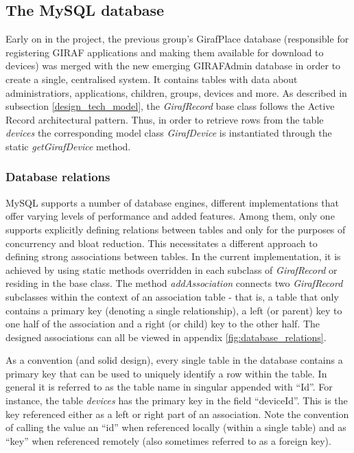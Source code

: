 \subsection{The MySQL database}
Early on in the project, the previous group's GirafPlace database (responsible for registering GIRAF applications and making them available for download to devices) was merged with the new emerging GIRAFAdmin database in order to create a single, centralised system. It contains tables with data about administratiors, applications, children, groups, devices and more.
As described in subsection \vref{design_tech_model}, the \emph{GirafRecord} base class follows the Active Record architectural pattern. Thus, in order to retrieve rows from the table \emph{devices} the corresponding model class \emph{GirafDevice} is instantiated through the static \emph{getGirafDevice} method.

\subsubsection*{Database relations}
MySQL supports a number of database engines, different implementations that offer varying levels of performance and added features. Among them, only one supports explicitly defining relations between tables and only for the purposes of concurrency and bloat reduction. This necessitates a different approach to defining strong associations between tables. In the current implementation, it is achieved by using static methods overridden in each subclass of \emph{GirafRecord} or residing in the base class.
The method \emph{addAssociation} connects two \emph{GirafRecord} subclasses within the context of an association table - that is, a table that only contains a primary key (denoting a single relationship), a left (or parent) key to one half of the association and a right (or child) key to the other half. The designed associations can all be viewed in appendix \vref{fig:database_relations}.

As a convention (and solid design), every single table in the database contains a primary key that can be used to uniquely identify a row within the table. In general it is referred to as the table name in singular appended with ``Id''. For instance, the table \emph{devices} has the primary key in the field ``deviceId''. This is the key referenced either as a left or right part of an association. Note the convention of calling the value an ``id'' when referenced locally (within a single table) and as ``key'' when referenced remotely (also sometimes referred to as a foreign key).

